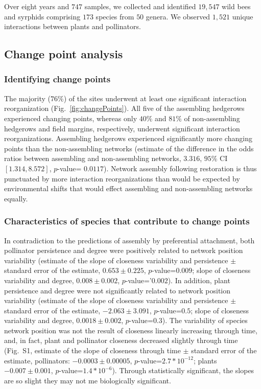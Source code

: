 \documentclass[12pt]{article}
\begin{document}
Over eight years and $747$ samples, we collected and identified
$19,547$ wild bees and syrphids comprising $173$ species from $50$
genera. We observed $1,521$ unique interactions between plants and
pollinators.

\subsection*{Change point analysis}
\subsubsection*{Identifying change points}

The majority ($76\%$) of the sites underwent at least one significant
interaction reorganization (Fig.~\ref{fig:changePoints}).  All five of
the assembling hedgerows experienced changing points, whereas only
$40\%$ and $81\%$ of non-assembling hedgerows and field margins,
respectively, underwent significant interaction
reorganizations. Assembling hedgerows experienced significantly more
changing points than the non-assembling networks (estimate of the
difference in the odds ratios between assembling and non-assembling
networks, $3.316$, $95\%$ CI $[1.314, 8.572]$, $p$-value=
$0.0117$). Network assembly following restoration is thus punctuated
by more interaction reorganizations than would be expected by
environmental shifts that would effect assembling and non-assembling
networks equally.

\subsubsection*{Characteristics of species that contribute to change
  points}

In contradiction to the predictions of assembly by preferential
attachment, both pollinator persistence and degree were positively
related to network position variability (estimate of the slope of
closeness variability and persistence $\pm$ standard error of the
estimate, $0.653 \pm 0.225$, $p$-value=$0.009$; slope of closeness
variability and degree, $0.008 \pm 0.002$, $p$-value='$0.002$). In
addition, plant persistence and degree were not significantly related
to network position variability (estimate of the slope of closeness
variability and persistence $\pm$ standard error of the estimate,
$-2.063 \pm 3.091$, $p$-value=$0.5$; slope of closeness variability
and degree, $0.0018 \pm 0.002$, $p$-value=$0.3$). The variability of
species network position was not the result of closeness linearly
increasing through time, and, in fact, plant and pollinator closeness
decreased slightly through time (Fig.~S1, estimate of the slope of
closeness through time $\pm$ standard error of the estimate,
pollinators: $-0.0003 \pm 0.00005$, $p$-value=$2.7*10^{-12}$; plants
$-0.007 \pm 0.001$, $p$-value=$1.4*10^{-6}$). Through statistically
significant, the slopes are so slight they may not me biologically
significant.
\end{document}
